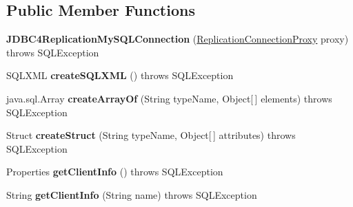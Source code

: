 \subsection*{Public Member Functions}
\begin{DoxyCompactItemize}
\item 
\mbox{\label{classcom_1_1mysql_1_1jdbc_1_1_j_d_b_c4_replication_my_s_q_l_connection_a10e6277eecea36ce930a7335ab88df17}} 
{\bfseries J\+D\+B\+C4\+Replication\+My\+S\+Q\+L\+Connection} (\mbox{\hyperlink{classcom_1_1mysql_1_1jdbc_1_1_replication_connection_proxy}{Replication\+Connection\+Proxy}} proxy)  throws S\+Q\+L\+Exception 
\item 
\mbox{\label{classcom_1_1mysql_1_1jdbc_1_1_j_d_b_c4_replication_my_s_q_l_connection_ad37312dde008c6caef3627ef2eb2cd42}} 
S\+Q\+L\+X\+ML {\bfseries create\+S\+Q\+L\+X\+ML} ()  throws S\+Q\+L\+Exception 
\item 
\mbox{\label{classcom_1_1mysql_1_1jdbc_1_1_j_d_b_c4_replication_my_s_q_l_connection_a91ce67269dfe6731240d406c641b8810}} 
java.\+sql.\+Array {\bfseries create\+Array\+Of} (String type\+Name, Object\mbox{[}$\,$\mbox{]} elements)  throws S\+Q\+L\+Exception 
\item 
\mbox{\label{classcom_1_1mysql_1_1jdbc_1_1_j_d_b_c4_replication_my_s_q_l_connection_adfa141bbdc7f03812fe45cf4992bb41e}} 
Struct {\bfseries create\+Struct} (String type\+Name, Object\mbox{[}$\,$\mbox{]} attributes)  throws S\+Q\+L\+Exception 
\item 
\mbox{\label{classcom_1_1mysql_1_1jdbc_1_1_j_d_b_c4_replication_my_s_q_l_connection_ad1f8c2f0fe92979bfe436d47bc686c9d}} 
Properties {\bfseries get\+Client\+Info} ()  throws S\+Q\+L\+Exception 
\item 
\mbox{\label{classcom_1_1mysql_1_1jdbc_1_1_j_d_b_c4_replication_my_s_q_l_connection_ab8806470b697ca1ffecebaab3b3a6d08}} 
String {\bfseries get\+Client\+Info} (String name)  throws S\+Q\+L\+Exception 

\end{DoxyCompactItemize}
